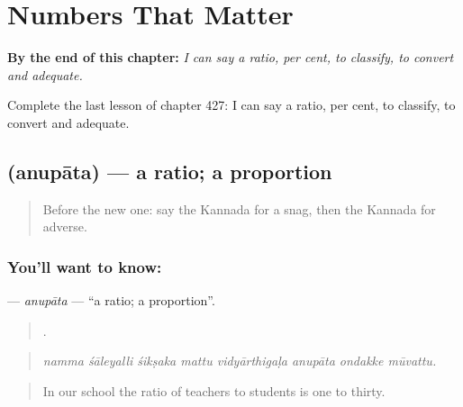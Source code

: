 
\chapter{Numbers That Matter}
\label{ch:ka-numbers-that-matter}

\begin{chapteropening}
\textbf{By the end of this chapter:} \emph{I can say a ratio, per cent, to classify, to convert and adequate.}

Complete the last lesson of chapter 427: I can say a ratio, per cent, to classify, to convert and adequate.
\end{chapteropening}

\section[\texorpdfstring{\kn{ಅನುಪಾತ} (anupāta)}{ಅನುಪಾತ (anupāta)}]{ (anupāta) — a ratio; a proportion}

\label{lesson:KA-C427-anupata}



\begin{quote}
Before the new one: say the Kannada for a snag, then the Kannada for adverse.
\end{quote}

\subsection*{You'll want to know: }
\textbf{} — \emph{anupāta} — \textquotedblleft{}a ratio; a proportion\textquotedblright{}.

\begin{quote}
       .
\end{quote}

\begin{quote}
\emph{namma śāleyalli śikṣaka mattu vidyārthigaḷa anupāta ondakke mūvattu.}
\end{quote}

\begin{quote}
In our school the ratio of teachers to students is one to thirty.
\end{quote}

